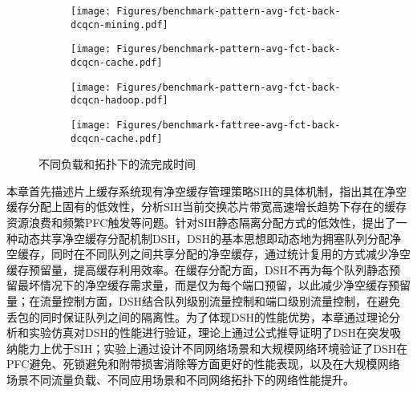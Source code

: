 \begin{figure}[H]
  \begin{subfigure}[b]{0.49\linewidth}
      \centering
      \texttt{[image: Figures/benchmark-pattern-avg-fct-back-dcqcn-mining.pdf]}
      \label{c3:s6:ss1:fig:sub1:benchmark pattern Spine-Leaf mining}
  \end{subfigure}
  \begin{subfigure}[b]{0.49\linewidth}
      \centering
      \texttt{[image: Figures/benchmark-pattern-avg-fct-back-dcqcn-cache.pdf]}
      \label{c3:s6:ss1:fig:sub1:benchmark pattern Spine-Leaf cache}
  \end{subfigure}
  \begin{subfigure}[b]{0.49\linewidth}
    \centering
    \texttt{[image: Figures/benchmark-pattern-avg-fct-back-dcqcn-hadoop.pdf]}
    \label{c3:s6:ss1:fig:sub1:benchmark pattern Spine-Leaf hadoop}
  \end{subfigure}
  \begin{subfigure}[b]{0.49\linewidth}
    \centering
    \texttt{[image: Figures/benchmark-fattree-avg-fct-back-dcqcn-cache.pdf]}
    \label{c3:s6:ss1:fig:sub1:benchmark pattern fat-tree search}
  \end{subfigure} 
  \caption{不同负载和拓扑下的流完成时间}
  \label{c3:s6:ss1:fig:benchmark pattern and topology}
\end{figure}

\label{c3:s7:brief summary}

本章首先描述片上缓存系统现有净空缓存管理策略SIH的具体机制，指出其在净空缓存分配上固有的低效性，分析SIH当前交换芯片带宽高速增长趋势下存在的缓存资源浪费和频繁PFC触发等问题。针对SIH静态隔离分配方式的低效性，提出了一种动态共享净空缓存分配机制DSH，DSH的基本思想即动态地为拥塞队列分配净空缓存，同时在不同队列之间共享分配的净空缓存，通过统计复用的方式减少净空缓存预留量，提高缓存利用效率。在缓存分配方面，DSH不再为每个队列静态预留最坏情况下的净空缓存需求量，而是仅为每个端口预留，以此减少净空缓存预留量；在流量控制方面，DSH结合队列级别流量控制和端口级别流量控制，在避免丢包的同时保证队列之间的隔离性。为了体现DSH的性能优势，本章通过理论分析和实验仿真对DSH的性能进行验证，理论上通过公式推导证明了DSH在突发吸纳能力上优于SIH；实验上通过设计不同网络场景和大规模网络环境验证了DSH在PFC避免、死锁避免和附带损害消除等方面更好的性能表现，以及在大规模网络场景不同流量负载、不同应用场景和不同网络拓扑下的网络性能提升。
